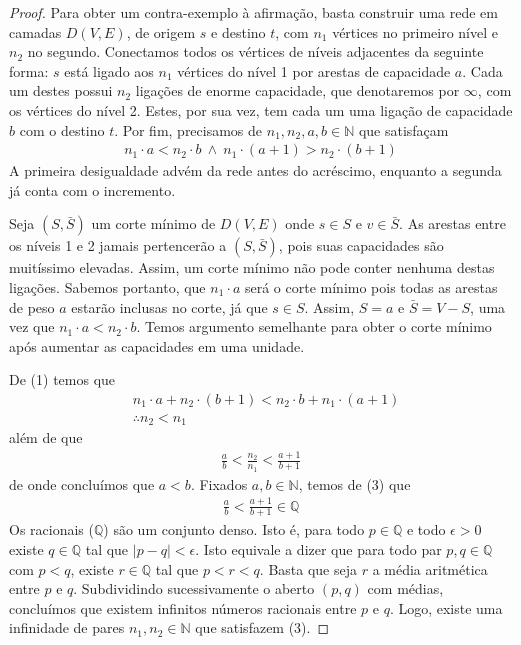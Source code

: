 \documentclass{homework}
\begin{document}
	\begin{proof}
		Para obter um contra-exemplo à afirmação, basta construir uma rede em camadas $D(V, E)$, de origem $s$ e destino $t$, com $n_1$ vértices no primeiro nível e $n_2$ no segundo. Conectamos todos os vértices de níveis adjacentes da seguinte forma: $s$ está ligado aos $n_1$ vértices do nível 1 por arestas de capacidade $a$. Cada um destes possui $n_2$ ligações de enorme capacidade, que denotaremos por $\infty$, com os vértices do nível 2. Estes, por sua vez, tem cada um uma ligação de capacidade $b$ com o destino $t$. Por fim, precisamos de $n_1, n_2, a, b \in \mathbb{N}$ que satisfaçam
		\begin{align}
			n_1 \cdot a < n_2 \cdot b ~ \wedge ~ n_1 \cdot (a + 1) > n_2 \cdot (b + 1)
		\end{align}
		A primeira desigualdade advém da rede antes do acréscimo, enquanto a segunda já conta com o incremento.\par
		
		Seja $(S, \bar{S})$ um corte mínimo de $D(V, E)$ onde $s \in S$ e $v \in \bar{S}$. As arestas entre os níveis 1 e 2 jamais pertencerão a $(S, \bar{S})$, pois suas capacidades são muitíssimo elevadas. Assim, um corte mínimo não pode conter nenhuma destas ligações. Sabemos portanto, que $n_1 \cdot a$ será o corte mínimo pois todas as arestas de peso $a$ estarão inclusas no corte, já que $s \in S$. Assim, $S = {a}$ e $\bar{S} = V - S$, uma vez que $n_1 \cdot a < n_2 \cdot b$. Temos argumento semelhante para obter o corte mínimo após aumentar as capacidades em uma unidade. \par
		
		De (1) temos que
		\begin{align}
			&n_1 \cdot a + n_2 \cdot(b + 1) < n_2 \cdot b + n_1 \cdot(a + 1) \nonumber \\
			&\therefore n_2 < n_1
		\end{align}
		além de que
		\begin{align}
			\frac{a}{b} < \frac{n_2}{n_1} < \frac{a + 1}{b + 1}
		\end{align}
		de onde concluímos que $a < b$. Fixados $a, b \in \mathbb{N}$, temos de (3) que
		\begin{align}
			\frac{a}{b} < \frac{a + 1}{b + 1} \in \mathbb{Q}
		\end{align}
		Os racionais ($\mathbb{Q}$) são um conjunto denso. Isto é, para todo $p \in \mathbb{Q}$ e todo $\epsilon > 0$ existe $q \in \mathbb{Q}$ tal que $|p - q| < \epsilon$. Isto equivale a dizer que para todo par $p, q \in \mathbb{Q}$ com $p < q$, existe $r \in \mathbb{Q}$ tal que $p < r < q$. Basta que seja $r$ a média aritmética entre $p$ e $q$. Subdividindo sucessivamente o aberto $(p, q)$ com médias, concluímos que existem infinitos números racionais entre $p$ e $q$. Logo, existe uma infinidade de pares $n_1, n_2 \in \mathbb{N}$ que satisfazem (3).
	\end{proof}
	
\end{document}
